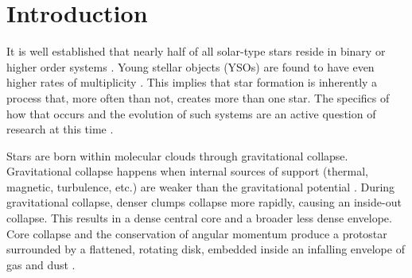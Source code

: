\documentclass[linenumbers,twocolumn, twocolappendix]{aastex631}
\begin{document}

\section{Introduction} 
\label{sec:intro}
It is well established that nearly half of all solar-type stars reside in binary or higher order systems \citep[e.g.,][]{Raghavan_et_al_2010, Offner_et_al_2023}. Young stellar objects (YSOs) are found to have even higher rates of multiplicity \citep[e.g.,][]{Looney_et_al_2000, Tobin_et_al_2022}. This implies that star formation is inherently a process that, more often than not, creates more than one star. The specifics of how that occurs and the evolution of such systems are an active question of research at this time \citep{Offner_et_al_2023}.

Stars are born within molecular clouds through gravitational collapse. Gravitational collapse happens when internal sources of support (thermal, magnetic, turbulence, etc.) are weaker than the gravitational potential  \citep{Shu_et_al_1987, mckee&ostriker_2007}. During gravitational collapse, denser clumps collapse more rapidly, causing an inside-out collapse. This results in a dense central core and a broader less dense envelope. Core collapse and the conservation of angular momentum produce a protostar surrounded by a flattened, rotating disk, embedded inside an infalling envelope of gas and dust \citep{Adams_et_al_1987}.
\end{document}
